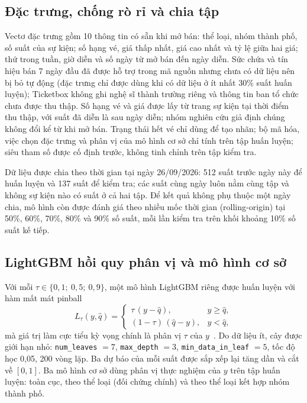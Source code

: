 \documentclass{IEEEtran}
\begin{document}
\subsection{Đặc trưng, chống rò rỉ và chia tập}
Vectơ đặc trưng gồm 10 thông tin có sẵn khi mở bán: thể loại, nhóm thành phố, số suất của sự kiện; số hạng vé, giá thấp nhất, giá cao nhất và tỷ lệ giữa hai giá; thứ trong tuần, giờ diễn và số ngày từ mở bán đến ngày diễn. Sức chứa và tín hiệu bán 7 ngày đầu đã được hỗ trợ trong mã nguồn nhưng chưa có dữ liệu nên bị bỏ tự động (đặc trưng chỉ được dùng khi có dữ liệu ở ít nhất 30\% suất huấn luyện); Ticketbox không ghi nghệ sĩ thành trường riêng và thông tin ban tổ chức chưa được thu thập. Số hạng vé và giá được lấy từ trang sự kiện tại thời điểm thu thập, với suất đã diễn là sau ngày diễn; nhóm nghiên cứu giả định chúng không đổi kể từ khi mở bán. Trạng thái hết vé chỉ dùng để tạo nhãn; bộ mã hóa, việc chọn đặc trưng và phân vị của mô hình cơ sở chỉ tính trên tập huấn luyện; siêu tham số được cố định trước, không tinh chỉnh trên tập kiểm tra.

Dữ liệu được chia theo thời gian tại ngày 26/09/2026: 512 suất trước ngày này để huấn luyện và 137 suất để kiểm tra; các suất cùng ngày luôn nằm cùng tập và không sự kiện nào có suất ở cả hai tập. Để kết quả không phụ thuộc một ngày chia, mô hình còn được đánh giá theo nhiều mốc thời gian (rolling-origin) tại 50\%, 60\%, 70\%, 80\% và 90\% số suất, mỗi lần kiểm tra trên khối khoảng 10\% số suất kế tiếp.

\subsection{LightGBM hồi quy phân vị và mô hình cơ sở}
Với mỗi $\tau \in \{0{,}1;\ 0{,}5;\ 0{,}9\}$, một mô hình LightGBM riêng được huấn luyện với hàm mất mát pinball
\begin{equation}
L_\tau(y, \hat{q}) =
\begin{cases}
\tau\,(y - \hat{q}), & y \geq \hat{q},\\
(1-\tau)\,(\hat{q} - y), & y < \hat{q},
\end{cases}
\label{eq:pinball}
\end{equation}
mà giá trị làm cực tiểu kỳ vọng chính là phân vị $\tau$ của $y$~\cite{koenker1978}. Do dữ liệu ít, cây được giới hạn nhỏ: \texttt{num\_leaves} $= 7$, \texttt{max\_depth} $= 3$, \texttt{min\_data\_in\_leaf} $= 5$, tốc độ học 0,05, 200 vòng lặp. Ba dự báo của mỗi suất được sắp xếp lại tăng dần và cắt về $[0, 1]$. Ba mô hình cơ sở dùng phân vị thực nghiệm của $y$ trên tập huấn luyện: toàn cục, theo thể loại (đối chứng chính) và theo thể loại kết hợp nhóm thành phố.
\end{document}
